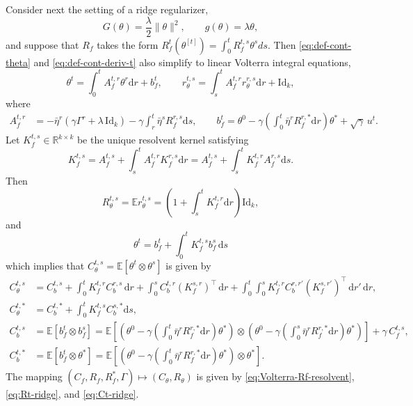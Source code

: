 \documentclass[11pt,letterpaper,reqno]{amsart}
\theoremstyle{definition}
\def\d{\mathrm{d}}
\def\E{\mathbb{E}}
\def\R{\mathbb{R}}
\def\Id{\mathrm{Id}}
\begin{document}
Consider next the setting of a ridge regularizer,
\[G(\theta)=\frac{\lambda}{2}\|\theta\|^2,
\qquad g(\theta)=\lambda \theta,\]
and suppose that $R_f$ takes the form
$R_f^t(\theta^{[t]})=\int_0^t R_f^{t,s} \theta^s ds$.
Then \eqref{eq:def-cont-theta} and \eqref{eq:def-cont-deriv-t} also simplify
to linear Volterra integral equations,
\[\theta^t=\int_0^t A_f^{t,r} \theta^r \d r + b_f^t,
\qquad r_\theta^{t,s}=\int_s^t A_f^{t,r} r_\theta^{r,s} \d r + \Id_k,\]
where
\begin{align*}
        A_f^{t,r} &= -\bar{\eta}^r \left({\gamma} \Gamma^r + \lambda\,\Id_k\right) - \gamma \int_r^t {\bar{\eta}^s} R_f^{r,s} \d s, \qquad
    b_f^t = \theta^0 - \gamma \left(\int_0^t
{\bar{\eta}^r}R_f^{r,*} \d r\right)  \theta^* + \sqrt{\gamma}\,u^t.
\end{align*}
Let $K_f^{t,s} \in \R^{k \times k}$ be the unique resolvent kernel satisfying
\begin{equation}\label{eq:Volterra-Rf-resolvent}
K_f^{t,s}=A_f^{t,s} + \int_s^t A_f^{t,r} K_f^{r,s} \d r
=A_f^{t,s}+\int_s^t K_f^{t,r}A_f^{r,s}\d s.
\end{equation}
Then
\begin{equation}\label{eq:Rt-ridge}
R_\theta^{t,s}=\E r_\theta^{t,s}=\left(1+\int_s^t K_f^{t,r}\d r \right) \Id_k,
\end{equation} 
and
\[\theta^t = b_f^t + \int_0^t K_f^{t,s} b_f^s \,\d s\]
which implies that $C_\theta^{t,s}=\E[\theta^t \otimes \theta^s]$ is given by
\begin{equation}\label{eq:Ct-ridge}
\begin{aligned}
C_\theta^{t,s}&=C_b^{t,s} 
+ \int_0^t K_f^{t,r} C_b^{r,s} \,\mathrm{d}r 
+ \int_0^s C_b^{t,r} (K_f^{s,r})^\top \,\mathrm{d}r 
+ \int_0^t \int_0^s K_f^{t,r} C_b^{r,r'} (K_f^{s,r'})^\top \,\mathrm{d}r'
\,\mathrm{d}r,\\
C_\theta^{t,*}&=C_b^{t,*}+\int_0^t K_f^{t,s}
C_b^{s,*} \d s,\\
C_b^{t,s}&=\E[b_f^t\otimes b_f^s]=\E\left[\left(\theta^0 
- \gamma \left(\int_0^t
{\bar{\eta}^r}R_f^{r,*} \d r\right)\theta^*\right)\otimes
\left(\theta^0 - \gamma \left(\int_0^s
{\bar{\eta}^r}R_f^{r,*} \d r\right)\theta^*\right)\right] + \gamma\,C_f^{t,s},\\
C_b^{t,*}&=\E[b_f^t\otimes \theta^*]=\E\left[\left(\theta^0 
- \gamma \left(\int_0^t
{\bar{\eta}^r}R_f^{r,*} \d r\right)\theta^*\right) \otimes \theta^* \right].
\end{aligned}
\end{equation}
The mapping $(C_f, R_f, R^*_f, \Gamma) \mapsto (C_\theta, R_\theta)$ is given
by \eqref{eq:Volterra-Rf-resolvent}, \eqref{eq:Rt-ridge}, and
\eqref{eq:Ct-ridge}.
\end{document}
